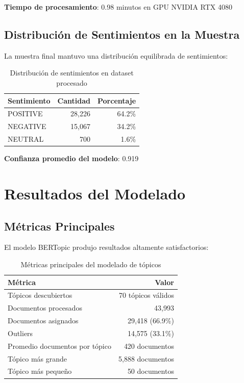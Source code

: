 \documentclass[12pt,a4paper,twoside,openany]{book}
\begin{document}
\textbf{Tiempo de procesamiento}: 0.98 minutos en GPU NVIDIA RTX 4080

\subsection{Distribución de Sentimientos en la Muestra}

La muestra final mantuvo una distribución equilibrada de sentimientos:

\begin{table}[H]
\centering
\caption{Distribución de sentimientos en dataset procesado}
\begin{tabular}{@{}lrr@{}}
\toprule
\textbf{Sentimiento} & \textbf{Cantidad} & \textbf{Porcentaje} \\
\midrule
POSITIVE & 28,226 & 64.2\% \\
NEGATIVE & 15,067 & 34.2\% \\
NEUTRAL & 700 & 1.6\% \\
\bottomrule
\end{tabular}
\end{table}

\textbf{Confianza promedio del modelo}: 0.919

\section{Resultados del Modelado}

\subsection{Métricas Principales}

El modelo BERTopic produjo resultados altamente satisfactorios:

\begin{table}[H]
\centering
\caption{Métricas principales del modelado de tópicos}
\begin{tabular}{@{}lr@{}}
\toprule
\textbf{Métrica} & \textbf{Valor} \\
\midrule
Tópicos descubiertos & 70 tópicos válidos \\
Documentos procesados & 43,993 \\
Documentos asignados & 29,418 (66.9\%) \\
Outliers & 14,575 (33.1\%) \\
Promedio documentos por tópico & 420 documentos \\
Tópico más grande & 5,888 documentos \\
Tópico más pequeño & 50 documentos \\
\bottomrule
\end{tabular}
\end{table}
\end{document}
